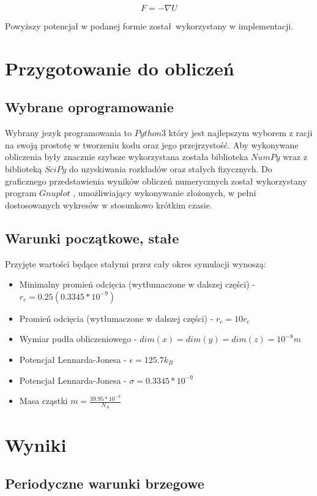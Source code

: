 \documentclass[a4paper,10pt]{article}
\begin{document}
\begin{equation}\label{eq:3}
F = -\nabla U
\end{equation}

Powyższy potencjał w podanej formie został wykorzystany w implementacji.

\section{Przygotowanie do obliczeń}
\subsection{Wybrane oprogramowanie}
Wybrany jezyk programowania to $Python3$ \cite{python} który jest najlepszym wyborem z racji na swoją prostotę w tworzeniu kodu oraz jego przejrzystość. Aby wykonywane obliczenia były znacznie szybsze wykorzystana została biblioteka $NumPy$ wraz z biblioteką $SciPy$ do uzyskiwania rozkładów oraz stałych fizycznych.  Do graficznego przedstawienia wyników obliczeń numerycznych został wykorzystany program $Gnuplot$ \cite{gnuplot}, umożliwiający wykonywanie złożonych, w pełni dostosowanych wykresów w stosunkowo krótkim czasie.

\subsection{Warunki początkowe, stałe}
Przyjęte wartości będące stałymi przez cały okres symulacji wynoszą:

\begin{itemize}
\item Minimalny promień odcięcia (wytłumaczone w dalszej części) - $r_c = 0.25(0.3345 * 10^{-9})$
\item Promień odcięcia (wytłumaczone w dalszej części) - $r_c = 10r_c$
\item Wymiar pudła obliczeniowego - $dim(x) = dim(y) = dim(z) = 10^{-8}m$
\item Potencjał Lennarda-Jonesa - $\epsilon = 125.7 k_B$
\item Potencjał Lennarda-Jonesa - $\sigma = 0.3345 * 10^{-9}$
\item Masa cząstki $m = \frac{39.95 * 10^{-3}}{N_A}$ 
\end{itemize}

\section{Wyniki}

\subsection{Periodyczne warunki brzegowe}
\end{document}
